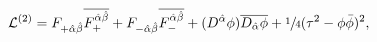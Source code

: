 \begin{equation}\label{eq:leea}
 \mathcal{L}^{(2)}=F_{+\hat{\alpha}\hat{\beta}}\overline{F_+^{\hat{\alpha}
 \hat{\beta}}}+F_{-\hat{\alpha}\hat{\beta}}\overline{F_-^{\hat{\alpha}
 \hat{\beta}}}+(D^{\hat{\alpha}}\phi)\overline{D_{\hat{\alpha}}\phi}+
 \sfrac{1}{4}(\tau^2-\phi\bar{\phi})^2,
\end{equation}

